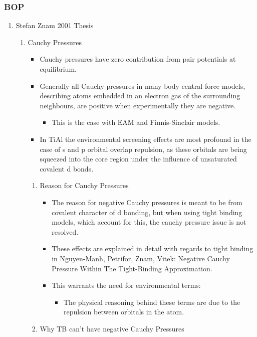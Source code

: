 \documentclass[11pt]{article}
\begin{document}
\subsubsection{BOP}
\label{sec:org20b3405}
\begin{enumerate}
\item Stefan Znam 2001 Thesis
\label{sec:org7ea87b5}
\begin{enumerate}
\item Cauchy Pressures
\label{sec:orgcec62f7}
\begin{itemize}
\item Cauchy pressures have zero contribution from pair potentials at
equilibrium.
\item Generally all Cauchy pressures in many-body central force models,
describing atoms embedded in an electron gas of the surrounding
neighbours, are positive when experimentally they are negative.
\begin{itemize}
\item This is the case with EAM and Finnis-Sinclair models.
\end{itemize}
\item In TiAl the environmental screening effects are most profound in the
case of s and p orbital overlap repulsion, as these orbitals are being
squeezed into the core region under the influence of unsaturated
covalent d bonds.
\end{itemize}
\begin{enumerate}
\item Reason for Cauchy Pressures
\label{sec:org4e2edab}
\begin{itemize}
\item The reason for negative Cauchy pressures is meant to be from covalent
character of d bonding, but when using tight binding models, which
account for this, the cauchy pressure issue is not resolved.
\item These effects are explained in detail with regards to tight binding in
Nguyen-Manh, Pettifor, Znam, Vitek: Negative Cauchy Pressure Within
The Tight-Binding Approximation.
\item This warrants the need for environmental terms:
\begin{itemize}
\item The physical reasoning behind these terms are due to the repulsion
between orbitals in the atom.
\end{itemize}
\end{itemize}
\item Why TB can't have negative Cauchy Pressures

\end{enumerate}
\end{enumerate}
\end{enumerate}
\end{document}
